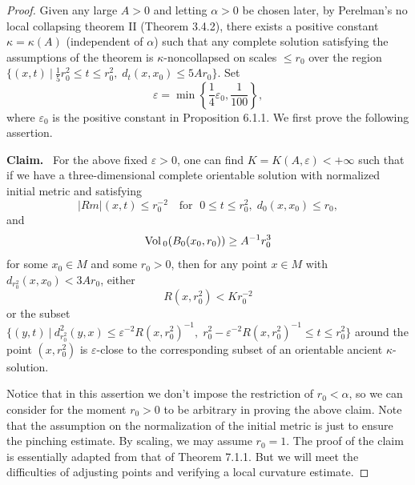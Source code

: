\begin{proof}
Given any large $A>0$ and letting $\alpha>0$ be chosen later,  by
Perelman's no local collapsing theorem II (Theorem 3.4.2), there
exists a positive constant $\kappa=\kappa(A)$ (independent of
$\alpha$) such that any complete solution satisfying the
assumptions of the theorem is $\kappa$-noncollapsed on scales $\le
r_0$ over the region $\{(x,t)\ |\ \frac{1}{5}r_0^2\le t\le
r_0^2,\;d_t(x,x_0)\le 5Ar_0\}.$ Set
$$
\varepsilon = \min \left\{ \frac{1}{4}\varepsilon_0,
\frac{1}{100}\right\},
$$
where $\varepsilon_0$ is the positive constant in Proposition
6.1.1. We first prove the following assertion.

\medskip
{\bf Claim.} \ For the above fixed $\varepsilon>0$, one can find
$K=K(A,\varepsilon)<+\infty$ such that if we have a
three-dimensional complete orientable solution with normalized
initial metric and satisfying
$$
|Rm|(x,t)\le r_0^{-2}\quad \mbox{for }\; 0\le t\le
r_0^2,\;d_0(x,x_0)\le r_0,
$$
and
$$
{\rm Vol}\,_0(B_0(x_0,r_0))\ge A^{-1}r_0^3
$$
for some $x_0 \in M$ and some $r_0 > 0$, then for any point $x\in
M$ with $d_{r_0^2}(x,x_0)<3Ar_0$, either $$R(x,r_0^2)< Kr_0^{-2}$$
or the subset $\{(y,t)\ |\ d_{r_0^2}^2(y,x)\leq \varepsilon^{-2}
R(x,r_0^2)^{-1},\;r_0^2-\varepsilon^{-2} R(x,r_0^2)^{-1}\le t\le
r_0^2\}$ around the point $(x,r_0^2)$ is $\varepsilon$-close to
the corresponding subset of an orientable ancient
$\kappa$-solution.
\medskip

Notice that in this assertion we don't impose the restriction of
$r_0<\alpha$, so we can consider for the moment $r_0>0$ to be
arbitrary in proving the above claim. Note that the assumption on
the normalization of the initial metric is just to ensure the
pinching estimate. By scaling, we may assume $r_0=1$. The proof of
the claim is essentially adapted from that of Theorem 7.1.1. But
we will meet the difficulties of adjusting points and verifying a
local curvature estimate.


\end{proof}
